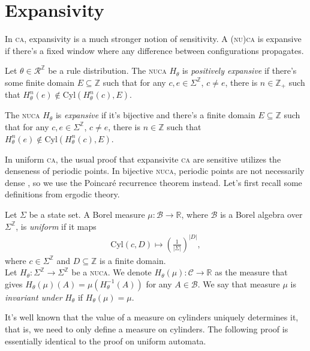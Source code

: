 \documentclass[runningheads]{llncs}
\newcommand{\Z}{\mathbb{Z}}
\newcommand{\cyl}{\mathrm{Cyl}}
\begin{document}
\section{Expansivity}


In \textsc{ca}, expansivity is a much stronger notion of sensitivity. A \textsc{(nu)ca} is expansive if there's a fixed window where any difference between configurations propagates.

\begin{definition}
Let $\theta \in \mathcal{R}^\Z$ be a rule distribution. The \textsc{nuca} $H_\theta$ is \emph{positively expansive} if there's some finite domain $E \subseteq \Z$ such that for any $c,e\in \Sigma^\Z$, $c \neq e$, there is $n\in \Z_+$ such that $H_\theta ^n (e) \notin \cyl (H_\theta ^n (c),E)$.

The \textsc{nuca} $H_\theta$ is \emph{expansive} if it's bijective and there's a finite domain $E \subseteq \Z$ such that for any $c,e\in \Sigma^\Z$, $c \neq e$, there is $n\in \Z$ such that $H_\theta ^n (e) \notin \cyl (H_\theta ^n (c),E)$.
\end{definition}

In uniform \textsc{ca}, the usual proof that expansivite \textsc{ca} are sensitive utilizes the denseness of periodic points. In bijective \textsc{nuca}, periodic points are not necessarily dense \cite{kamilya}, so we use the Poincaré recurrence theorem instead. Let's first recall some definitions from ergodic theory.

\begin{definition}
Let $\Sigma$ be a state set. A Borel measure $\mu: \mathcal{B} \rightarrow \mathbb{R}$, where $\mathcal{B}$ is a Borel algebra over $\Sigma^\Z$, is \emph{uniform} if it maps 
\begin{align*}
\cyl (c,D) \mapsto \left( \frac{1}{|\Sigma|} \right) ^{|D|},
\end{align*}
where $c \in \Sigma^\Z$ and $D\subseteq \Z$ is a finite domain.\\ %

Let $H_\theta:\Sigma^\Z \rightarrow \Sigma^\Z$ be a \textsc{nuca}. We denote $H_\theta(\mu):\mathcal{C}\rightarrow \mathbb{R}$ as the measure that gives $H_\theta(\mu)(A) = \mu (H_\theta^{-1} (A))$ for any $A \in \mathcal{B}$. We say that measure $\mu$ is \emph{invariant under} $H_\theta$ if $H_\theta(\mu) = \mu$.
\end{definition}

It's well known that the value of a measure on cylinders uniquely determines it, that is, we need to only define a measure on cylinders. \cite{ergodic}
The following proof is essentially identical to the proof on uniform automata.
 
\end{document}
